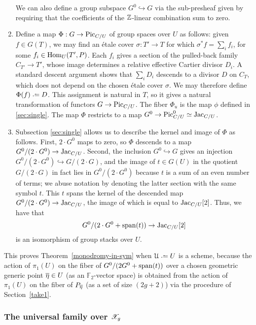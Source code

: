 \begin{enumerate}[itemsep=0.25cm]
	We can also define a group subspace ${G}^0 \hookrightarrow {G}$ via the sub-presheaf given by requiring that the coefficients of the ${\mathbb Z}$-linear combination sum to zero.
	\item Define a map $\Phi: {G} \to \operatorname{Pic}_{{C}/{U}}$ of group spaces over ${U}$ as follows: given $f \in {G}(T)$, we may find an \'etale cover $\sigma: T' \to T$ for which $\sigma^* f = \sum_i f_i$, for some $f_i \in \operatorname{Hom}_{{U}}(T', {P})$. Each $f_i$ gives a section of the pulled-back family ${C}_{T'} \to T'$, whose image determines a relative effective Cartier divisor $D_i$. A standard descent argument shows that $\sum_i D_i$ descends to a divisor $D$ on ${C}_T$, which does not depend on the chosen \'etale cover $\sigma$. We may therefore define $\Phi(f) \defeq D$. This assignment is natural in $T$, so it gives a natural transformation of functors ${G} \to \operatorname{Pic}_{{C}/{U}}$. The fiber $\Phi_u$ is the map $\phi$ defined in \ref{sec:single}. The map $\Phi$ restricts to a map ${G}^0 \to \operatorname{Pic}_{{C}/{U}}^0 \simeq \operatorname{Jac}_{{C}/{U}}$.
	\item Subsection \ref{sec:single} 
    allows us to describe the kernel and image of $\Phi$ as follows. First, $2 \cdot G^0$ maps to zero, so $\Phi$ descends to a map $G^0 / (2 \cdot G^0) \to \operatorname{Jac}_{C/U}$. Second, the inclusion $G^0 \hookrightarrow G$ gives an injection $G^0 / (2 \cdot G^0) \hookrightarrow G / (2 \cdot G)$, and the image of $t \in G(U)$ in the quotient $G / (2\cdot G)$ in fact lies in $G^0 / (2 \cdot G^0)$ because $t$ is a sum of an even number of terms; we abuse notation by denoting the latter section with the same symbol $t$. This $t$ spans the kernel of the descended map $G^0 / (2 \cdot G^0) \to \operatorname{Jac}_{C/U}$, the image of which is equal to $\operatorname{Jac}_{C/U}[2]$. Thus, we have that
	\[
		G^0 / (2 \cdot G^0 + \operatorname{span}(t)) \to \operatorname{Jac}_{C/U}[2]
	\]
	is an isomorphism of group stacks over $U$.
\end{enumerate}
This proves Theorem~\ref{monodromy-in-sym} when $\mc{U} \defeq U$ is a scheme, because the action of $\pi_1(U)$ on the fiber of $G^0 / (2G^0 + \operatorname{span}(t))$ over a chosen geometric generic point $\overline{\eta} \in U$ (as an $\mathbb{F}_2$-vector space) is obtained from the action of $\pi_1(U)$ on the fiber of $P_{\overline{\eta}}$ (as a set of size $(2g+2)$) via the procedure of Section~\ref{take1}.

\subsubsection{The universal family over $\mathscr{X}_g$} \label{part3}

